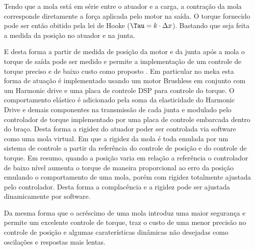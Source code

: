 Tendo que a mola está em série entre o atuador e a carga, a contração da mola corresponde diretamente a força aplicada pelo motor na saída. O torque fornecido pode ser então obitido pela lei de Hooke ($\Tau = k\cdot \Delta x$). Bastando que seja feita a medida da posição no atuador e na junta.


E desta forma a partir de medida de posição da motor e da junta após a mola o torque de saída pode ser medido e permite a implementação de um controle de torque preciso e de baixo custo como proposto \cite{nobody}. Em particular no meka esta forma de atuação é implementado usando um motor Brushless em conjunto com um Harmonic drive e uma placa de controle DSP para controle do torque. O comportamento elástico é adicionado pela soma da elasticidade do Harmonic Drive e demais componentes na transmissão de cada junta e modulado pelo controlador de torque implementado por uma placa de controle embarcada dentro do braço. Desta forma a rigidez do atuador poder ser controlada via software como uma mola virtual. Em que a rigidez da mola é toda emulada por um sistema de controle a partir da referência do controle de posição e do controle de torque. Em resumo, quando a posição varia em relação a referência o controlador de baixo nível aumenta o torque de maneira proporcional ao erro da posição emulando o comportamento de uma mola, porém com rigidez totalmente ajustada pelo controlador. Desta forma a complacência e a rigidez pode ser ajustada dinamicamente por software. \cite{nobody}

Da mesma forma que o acréscimo de uma mola introduz uma maior segurança e permite um excelente controle de torque, traz o custo de uma menor precisão no controle de posição e algumas caraterísticas dinâmicas não desejadas como oscilações e respostas mais lentas.




